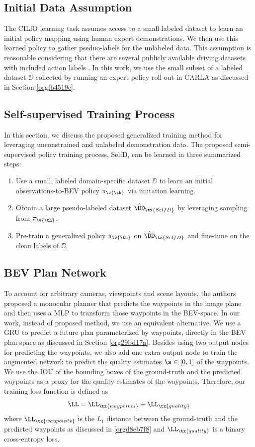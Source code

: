 \documentclass[letterpaper, 12pt]{book}
\theoremstyle{definition}
\theoremstyle{definition}
\theoremstyle{definition}
\theoremstyle{definition}
\theoremstyle{definition}
\begin{document}
\subsection{Initial Data Assumption}
\label{sec:orga520462}
The CILfO learning task assumes access to a small labeled dataset to learn an
initial policy mapping using human expert demonstrations. We then use this
learned policy to gather pseduo-labels for the unlabeled data. This assumption
is reasonable considering that there are several publicly available driving
datasets with included action labels \cite{Geiger2012AreWR,Argoverse2}. In this
work, we use the small subset of a labeled dataset \(\DD\) collected by running
an expert policy roll out in CARLA \cite{Dosovitskiy2017} as discussed in
Section \ref{orgfb4519e}.

\subsection{Self-supervised Training Process}
\label{sec:orgcbb1dcf}
In this section, we discuss the proposed generalized training method for
leveraging unconstrained and unlabeled demonstration data. The proposed
semi-supervised policy training process, SelfD, can be learned in three
summarized steps:
\begin{enumerate}
\item Use a small, labeled domain-specific dataset \(\DD\) to learn an initial
observations-to-BEV policy \(\pi_{\v{\th}}\) via imitation learning.
\item Obtain a large pseudo-labeled dataset \(\hat{\DD}_{\tx{SelfD}}\) by
leveraging sampling from \(\pi_{\v{\th}}\).
\item Pre-train a generalized policy \(\pi_{\v{\th}}\) on
\(\hat{\DD}_{\tx{SelfD}}\) and fine-tune on the clean labels of \(\DD\).
\end{enumerate}

\subsection{BEV Plan Network}
\label{sec:org14f36e1}
To account for arbitrary cameras, viewpoints and scene layouts, the authors
proposed a monocular planner that predicts the waypoints in the image plane and
then uses a MLP to transform those waypoints in the BEV-space. In our work,
instead of proposed method, we use an equivalent alternative. We use a GRU to
predict a future plan parameterized by waypoints, directly in the BEV plan space
as discussed in Section \ref{org29bd17a}. Besides using two output nodes for predicting the
waypoints, we also add one extra output node to train the augmented network to
predict the quality estimates \(\s\in [0,1]\) of the waypoints. We use the IOU
of the bounding boxes of the ground-truth and the predicted waypoints as a proxy
for the quality estimates of the waypoints. Therefore, our training loss
function is defined as \[\LL=\LL_{\tx{waypoints}}+\LL_{\tx{quality}}\] where
\(\LL_{\tx{waypoints}}\) is the \(L_{1}\) distance between the ground-truth and
the predicted waypoints as discussed in \ref{orgd8eb7f8} and \(\LL_{\tx{quality}}\) is a
binary cross-entropy loss.
\end{document}
